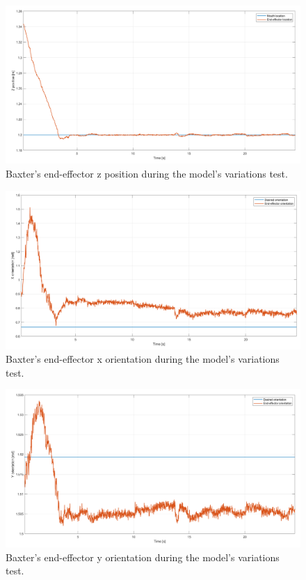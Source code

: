 \documentclass[11pt]{report} %
\begin{document}
\begin{figure}[H]
    \centering
    \includegraphics[width=1.0\linewidth]{assets/imgs/control_theory/mpc_regulation_model_changed/z_pose.png}
    \caption{Baxter's end-effector z position during the model's variations test.} 
    \label{fig_baxter_z_pose_mpc_model_perturbations_experiments}
\end{figure}

\begin{figure}[H]
    \centering
    \includegraphics[width=1.0\linewidth]{assets/imgs/control_theory/mpc_regulation_model_changed/x_orientation.png}
    \caption{Baxter's end-effector x orientation during the model's variations test.} 
    \label{fig_baxter_x_orientation_mpc_model_perturbations_experiments}
\end{figure}

\begin{figure}[H]
    \centering
    \includegraphics[width=1.0\linewidth]{assets/imgs/control_theory/mpc_regulation_model_changed/y_orientation.png}
    \caption{Baxter's end-effector y orientation during the model's variations test.} 
    \label{fig_baxter_y_orientation_mpc_model_perturbations_experiments}
\end{figure}
\end{document}
